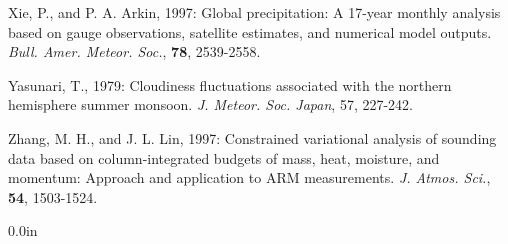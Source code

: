 \documentclass[12pt]{article}
\begin{document}
Xie, P., and P. A. Arkin, 1997: Global precipitation: A 17-year monthly analysis
 based on gauge observations, satellite estimates, and numerical model outputs.
{\it Bull. Amer. Meteor. Soc.}, {\bf 78}, 2539-2558.

Yasunari, T., 1979: Cloudiness fluctuations associated with the northern
hemisphere
summer monsoon. {\it J. Meteor. Soc. Japan}, 57, 227-242.

Zhang, M. H., and J. L. Lin, 1997: Constrained variational analysis of sounding
data based on column-integrated budgets of mass, heat, moisture, and momentum:
Approach and application to ARM measurements.
{\it J. Atmos. Sci.}, {\bf 54}, 1503-1524.


\newpage

\setlength {\parindent} {0.0in}
\hspace*{1.8in}{\bf FIGURE CAPTIONS}
\\
\end{document}
